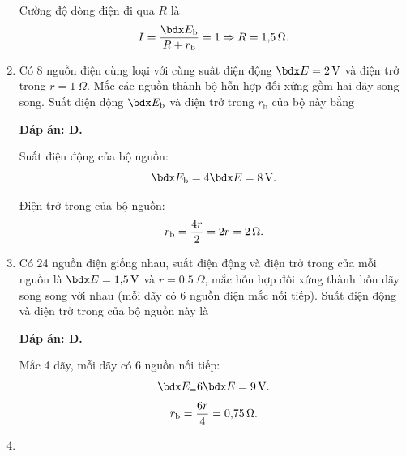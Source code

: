 \begin{enumerate}[label=\bfseries Câu \arabic*:]
{		Cường độ dòng điện đi qua $R$ là
		$$I=\dfrac{\calE_\text b}{R+r_\text b} = 1 \Rightarrow R = \SI{1.5}{\Omega}.$$
	}
	\item {}
	
	\cauhoi
	{Có 8 nguồn điện cùng loại với cùng suất điện động $\calE=\SI{2}{V}$ và điện trở trong $r=\SI{1}{\Omega}$. Mắc các nguồn thành bộ hỗn hợp đối xứng gồm hai dãy song song. Suất điện động $\calE_\text{b}$ và điện trở trong $r_\text{b}$ của bộ này bằng
		
	}
	\loigiai
	{	\textbf{Đáp án: D.}
		
		Suất điện động của bộ nguồn:
		$$\calE_\text b = 4 \calE = \SI{8}{V}.$$
		
		Điện trở trong của bộ nguồn:
		$$r_\text b = \dfrac{4r}{2} = 2r =\SI{2}{\Omega}.$$
	}
	\item {}
	
	\cauhoi
	{Có 24 nguồn điện giống nhau, suất điện động và điện trở trong của mỗi nguồn là $\calE=\SI{1.5}{V}$ và $r=\SI{0.5}{\Omega}$, mắc hỗn hợp đối xứng thành bốn dãy song song với nhau (mỗi dãy có 6 nguồn điện mắc nối tiếp). Suất điện động và điện trở trong của bộ nguồn này là
		
	}
	\loigiai
	{	\textbf{Đáp án: D.}
		
		Mắc 4 dãy, mỗi dãy có 6 nguồn nối tiếp:
		$$\calE_\text = 6\calE = \SI{9}{V}.$$
		$$r_\text b = \dfrac{6r}{4} = \SI{0.75}{\Omega}.$$
	}
	\item {}
	

\end{enumerate}
